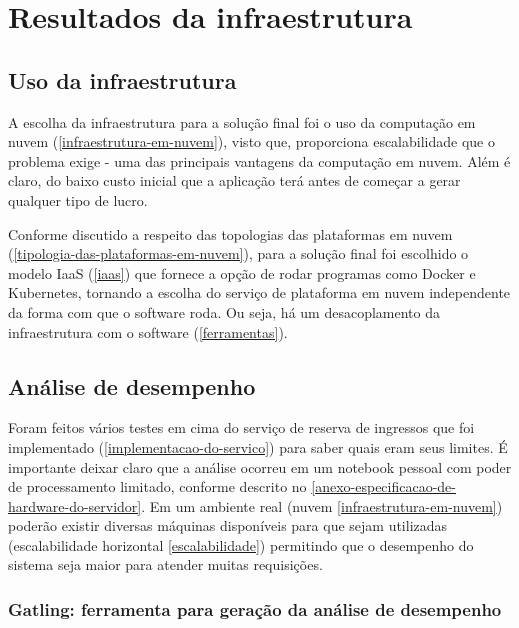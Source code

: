 \chapter{Resultados da infraestrutura}

\section{Uso da infraestrutura}

A escolha da infraestrutura para a solução final foi o uso da
computação em nuvem (\autoref{infraestrutura-em-nuvem}), visto que, proporciona
escalabilidade que o problema exige - uma das principais vantagens da computação em nuvem.
Além é claro, do baixo custo inicial que a aplicação terá antes de começar a gerar qualquer
tipo de lucro.

Conforme discutido a respeito das topologias das plataformas em
nuvem (\autoref{tipologia-das-plataformas-em-nuvem}), para a solução final foi escolhido o
modelo IaaS (\autoref{iaas}) que fornece a opção de rodar programas como Docker e
Kubernetes, tornando a escolha do serviço de plataforma em nuvem independente da forma
com que o software roda. Ou seja, há um desacoplamento da infraestrutura com o software
(\autoref{ferramentas}).

\section{Análise de desempenho}

Foram feitos vários testes em cima do serviço de reserva de ingressos que foi implementado
(\autoref{implementacao-do-servico}) para saber quais eram seus limites.
É importante deixar claro que a análise ocorreu em um notebook pessoal com poder
de processamento limitado, conforme descrito no
\autoref{anexo-especificacao-de-hardware-do-servidor}.
Em um ambiente real (nuvem \autoref{infraestrutura-em-nuvem})
poderão existir diversas máquinas disponíveis para que sejam utilizadas
(escalabilidade horizontal \autoref{escalabilidade})
permitindo que o desempenho do sistema seja maior para atender muitas requisições.

\subsection{Gatling: ferramenta para geração da análise de desempenho}

